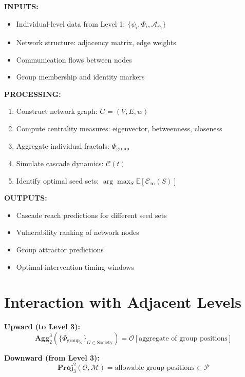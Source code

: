 \documentclass[11pt,twoside]{book}
\newcommand{\Frac}{\Phi}
\newcommand{\PsychAttractor}{\mathcal{A}_\psi}
\newcommand{\GroupFrac}{\Phi_{\mathrm{group}}}
\newcommand{\Overton}{\mathcal{O}}
\newcommand{\Memetic}{\mathcal{M}}
\newcommand{\Cascade}{\mathcal{C}}
\newcommand{\Aggregate}[2]{\mathbf{Agg}_{#1}^{#2}}
\newcommand{\Project}[2]{\mathbf{Proj}_{#1}^{#2}}
\begin{document}
\begin{tcolorbox}[colback=blue!5!white,colframe=blue!65!black,title=\textbf{Level 2 I/O Specification}]
\textbf{INPUTS:}
\begin{itemize}
    \item Individual-level data from Level 1: $\{\psi_i, \Frac_i, \PsychAttractor_i\}$
    \item Network structure: adjacency matrix, edge weights
    \item Communication flows between nodes
    \item Group membership and identity markers
\end{itemize}

\textbf{PROCESSING:}
\begin{enumerate}
    \item Construct network graph: $G = (V, E, w)$
    \item Compute centrality measures: eigenvector, betweenness, closeness
    \item Aggregate individual fractals: $\GroupFrac$
    \item Simulate cascade dynamics: $\Cascade(t)$
    \item Identify optimal seed sets: $\arg\max_S \mathbb{E}[\Cascade_\infty(S)]$
\end{enumerate}

\textbf{OUTPUTS:}
\begin{itemize}
    \item Cascade reach predictions for different seed sets
    \item Vulnerability ranking of network nodes
    \item Group attractor predictions
    \item Optimal intervention timing windows
\end{itemize}
\end{tcolorbox}

\section{Interaction with Adjacent Levels}

\textbf{Upward (to Level 3):}
\begin{equation}
    \Aggregate{2}{3}(\{\GroupFrac_G\}_{G \in \mathrm{Society}}) =
    \Overton[\text{aggregate of group positions}]
\end{equation}

\textbf{Downward (from Level 3):}
\begin{equation}
    \Project{3}{2}(\Overton, \Memetic) = \text{allowable group positions} \subset \mathcal{P}
\end{equation}
\end{document}
